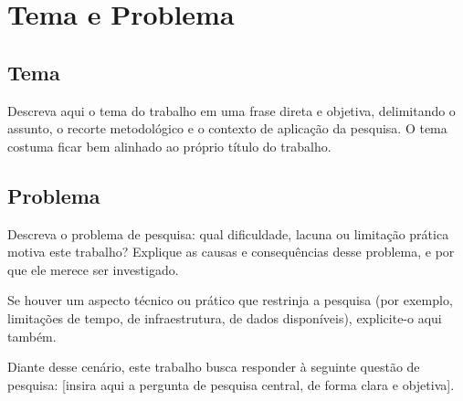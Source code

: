 \chapter{Tema e Problema}

\section{Tema}

Descreva aqui o tema do trabalho em uma frase direta e objetiva, delimitando o assunto, o recorte metodológico e o contexto de aplicação da pesquisa. O tema costuma ficar bem alinhado ao próprio título do trabalho.

\section{Problema}

Descreva o problema de pesquisa: qual dificuldade, lacuna ou limitação prática motiva este trabalho? Explique as causas e consequências desse problema, e por que ele merece ser investigado.

Se houver um aspecto técnico ou prático que restrinja a pesquisa (por exemplo, limitações de tempo, de infraestrutura, de dados disponíveis), explicite-o aqui também.

Diante desse cenário, este trabalho busca responder à seguinte questão de pesquisa: [insira aqui a pergunta de pesquisa central, de forma clara e objetiva].
